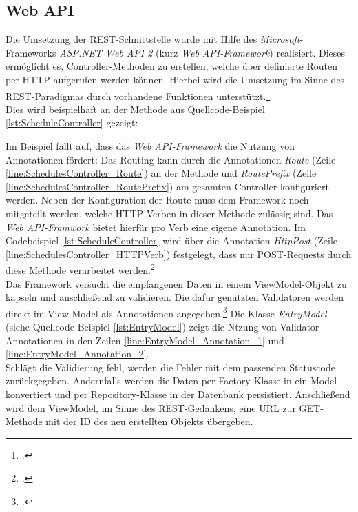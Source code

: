 \subsection{Web API}
\label{ssec:aufbau-webapi}
Die Umsetzung der \ac{REST}-Schnittstelle wurde mit Hilfe des \textit{Microsoft}-Frameworks \textit{ASP.NET Web API 2} (kurz \textit{Web \ac{API}-Framework}) realisiert. Dieses ermöglicht es, Controller-Methoden zu erstellen, welche über definierte Routen per \ac{HTTP} aufgerufen werden können. Hierbei wird die Umsetzung im Sinne des \ac{REST}-Paradigmas durch vorhandene Funktionen unterstützt.\footcite[S. 2ff.]{Building-a-REST-Service}\\
Dies wird beispielhaft an der Methode aus Quellcode-Beispiel \ref{lst:ScheduleController} gezeigt:

Im Beispiel fällt auf, dass das \textit{Web \ac{API}-Framework} die Nutzung von Annotationen fördert: Das Routing kann durch die Annotationen \textit{Route} (Zeile \ref{line:SchedulesController_Route}) an der Methode und \textit{RoutePrefix} (Zeile \ref{line:SchedulesController_RoutePrefix}) am gesamten Controller konfiguriert werden. Neben der Konfiguration der Route muss dem Framework noch mitgeteilt werden, welche \ac{HTTP}-Verben in dieser Methode zulässig sind. Das \textit{Web \ac{API}-Framwork} bietet hierfür pro Verb eine eigene Annotation. Im Codebeispiel \ref{lst:ScheduleController} wird über die Annotation \textit{HttpPost} (Zeile \ref{line:SchedulesController_HTTPVerb}) festgelegt, dass nur POST-Requests durch diese Methode verarbeitet werden.\footcite{webApi-AttributeRouting} \\
Das Framework versucht die empfangenen Daten in einem ViewModel-Objekt zu kapseln und anschließend zu validieren. Die dafür genutzten Validatoren werden direkt im View-Model als Annotationen angegeben.\footcite{webApi-Validation} Die Klasse \textit{EntryModel} (siehe Quellcode-Beispiel \ref{lst:EntryModel}) zeigt die Ntzung von Validator-Annotationen in den Zeilen \ref{line:EntryModel_Annotation_1} und \ref{line:EntryModel_Annotation_2}. \\ 

Schlägt die Validierung fehl, werden die Fehler mit dem passenden Statuscode zurückgegeben. Andernfalls werden die Daten per \gls{Factory}-Klasse in ein Model konvertiert und per \gls{Repository}-Klasse in der Datenbank persistiert. Anschließend wird dem ViewModel, im Sinne des \ac{REST}-Gedankens, eine URL zur GET-Methode mit der ID des neu erstellten Objekts übergeben. 
